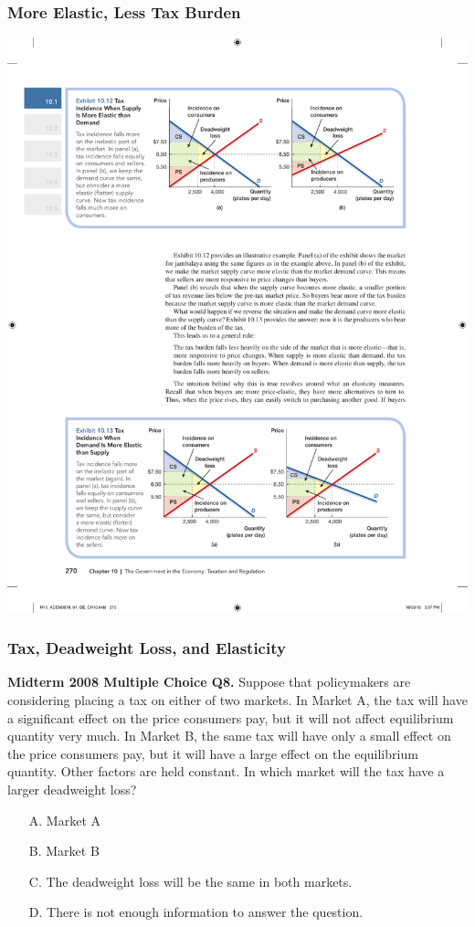 \documentclass[12pt, xcolor=dvipsnames]{beamer}
\begin{document}
\begin{frame}
\frametitle{\bf More Elastic, Less Tax Burden}
\begin{center}
\includegraphics[width=\linewidth]{figures/9.pdf}
\end{center}
\end{frame}


\begin{frame}
\frametitle{\bf Tax, Deadweight Loss, and Elasticity}
\noindent \small \textsf{\bfseries Midterm 2008 Multiple Choice Q8.}
Suppose that policymakers are considering placing a tax on either of two markets. In Market A, the tax will have a significant effect on the price consumers pay, but it will not affect equilibrium quantity very much. In Market B, the same tax will have only a small effect on the price consumers pay, but it will have a large effect on the equilibrium quantity. Other factors are held constant. In which market will the tax have a larger deadweight loss?
\begin{enumerate}\itemsep-0.5ex
\item[A.] Market A
\item[B.] Market B
\item[C.] The deadweight loss will be the same in both markets.
\item[D.] There is not enough information to answer the question.
\end{enumerate}
\end{frame}
\end{document}
